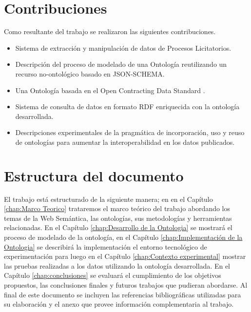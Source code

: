 \section{Contribuciones}
\label{Contribuciones}
Como resultante del trabajo se realizaron las siguientes contribuciones.
\begin{itemize}
\item \label{contrib:1}Sistema de extracción y manipulación de datos de Procesos Licitatorios.
\item \label{contrib:2}Descripción del proceso de modelado de una Ontología reutilizando un recurso no-ontológico basado en JSON-SCHEMA\cite {JSONSche10:online}.
\item \label{contrib:3}Una Ontología basada en el Open Contracting Data Standard \cite{OCDSReleaseSchema:online}.
\item \label{contrib:4}Sistema de consulta de datos en formato RDF enriquecida con la ontología desarrollada.
\item \label{contrib:5}Descripciones experimentales de la pragmática de incorporación, uso y reuso de ontologías para aumentar la interoperabilidad en los datos publicados.

\end{itemize}
 

\section{Estructura del documento}
El trabajo está estructurado de la siguiente manera; en  en el  Capítulo \ref{chap:Marco Teorico}  trataremos el marco teórico del trabajo abordando los temas de la Web Semántica, las ontologías, sus metodologías y herramientas relacionadas. En el Capítulo \ref{chap:Desarrollo de la Ontologia} se mostrará el proceso de modelado de la ontología, en el Capítulo \ref{chap:Implementación de la Ontologia} se describirá la implementación el entorno tecnológico de experimentación para luego en el Capítulo  \ref{chap:Contexto experimental} mostrar las pruebas realizadas a los datos utilizando la ontología desarrollada. En el Capítulo \ref{chap:conclusiones} se evaluará el cumplimiento de los objetivos propuestos, las conclusiones finales y futuros trabajos que pudieran abordarse. Al final de este documento  se  incluyen las referencias bibliográficas utilizadas para su elaboración y el anexo que provee información complementaria al trabajo.


